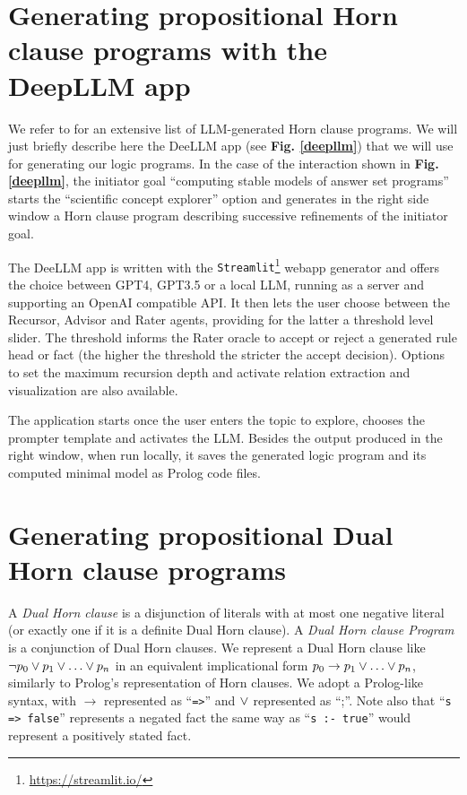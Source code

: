 \documentclass[submission,copyright,creativecommons]{eptcs}
\begin{document}
\section{Generating propositional Horn clause programs with the DeepLLM app}\label{horn}


We refer to \cite{tarau2023automation} for an extensive list of LLM-generated Horn clause programs. We will just briefly describe here the DeeLLM app (see {\bf Fig. \ref{deepllm}}) that we will use for generating our logic programs.
In the case of the interaction shown in {\bf Fig. \ref{deepllm}}, the initiator goal
``computing stable models of answer set programs'' starts the ``scientific concept explorer'' option and generates in the right side window a Horn clause program describing successive refinements of the initiator goal.

The DeeLLM app is written with the {\tt Streamlit}\footnote{\url{https://streamlit.io/}} webapp generator and offers the choice between GPT4, GPT3.5 or a local LLM, running as a server and supporting an OpenAI compatible API. It then lets the user choose between the Recursor, Advisor and Rater agents, providing for the latter a threshold level slider. The threshold informs the Rater oracle to accept or reject a generated rule head or fact (the higher the threshold the stricter the accept decision). Options to set the maximum recursion depth and activate relation extraction and visualization are also available.

The application starts once the user enters the topic to explore, chooses the prompter template and activates the LLM. Besides the output produced in the right window, when run locally, it saves the generated logic program and its computed minimal model as Prolog code files.

 


\section{Generating propositional Dual Horn clause programs}\label{dual}

A {\em Dual Horn clause} is a disjunction of literals with at most one negative literal (or exactly one if it is a definite Dual Horn clause).
A {\em Dual Horn clause Program}  is a conjunction of Dual Horn clauses.
We represent a Dual Horn clause like
$
\neg p_0 \vee  p_1 \vee \ldots \vee   p_n
$
in an equivalent implicational form
$
p_0 \rightarrow p_1 \vee  \ldots \vee p_n
$,
similarly to Prolog's representation of Horn clauses.
We adopt a
Prolog-like syntax, with $\rightarrow$ represented as ``\verb~=>~'' and $\vee$ represented as ``;''.
Note also that ``\verb~s => false~'' represents a negated fact the same way as ``\verb~s :- true~'' would represent a positively stated fact.
\end{document}
